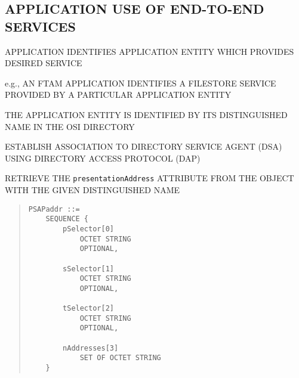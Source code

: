 \begin{bwslide}
\part*	{APPLICATION USE OF END-TO-END SERVICES}\bf

\begin{nrtc}
\item	APPLICATION IDENTIFIES APPLICATION ENTITY WHICH PROVIDES
	DESIRED SERVICE
    \begin{nrtc}
    \item	e.g., AN FTAM APPLICATION IDENTIFIES A FILESTORE SERVICE
		PROVIDED BY A PARTICULAR APPLICATION ENTITY    
    \end{nrtc}

\item	THE APPLICATION ENTITY IS IDENTIFIED BY ITS DISTINGUISHED NAME IN
	THE OSI DIRECTORY
\end{nrtc}
\end{bwslide}


\begin{bwslide}

\begin{nrtc}
\item	ESTABLISH ASSOCIATION TO DIRECTORY SERVICE AGENT (DSA)
	USING DIRECTORY ACCESS PROTOCOL (DAP)

\item	RETRIEVE THE \verb"presentationAddress" ATTRIBUTE FROM
	THE OBJECT WITH THE GIVEN DISTINGUISHED NAME
\end{nrtc}

\begin{quote}\small\begin{verbatim}
PSAPaddr ::=
    SEQUENCE {
        pSelector[0]
            OCTET STRING
            OPTIONAL,

        sSelector[1]
            OCTET STRING
            OPTIONAL,

        tSelector[2]
            OCTET STRING
            OPTIONAL,

        nAddresses[3]
            SET OF OCTET STRING
    }
\end{verbatim}\end{quote}
\end{bwslide}


